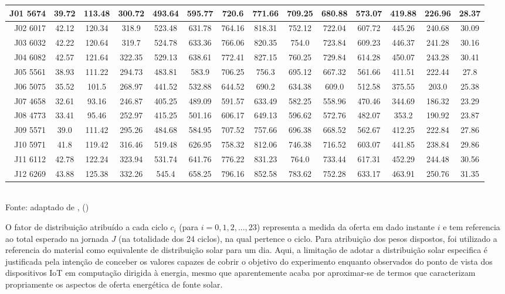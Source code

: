 \begin{table}[h]
\begin{tabular}{ r | *{13}{c} }
	\hline
	J01 5674 & 39.72 & 113.48 & 300.72 & 493.64 & 595.77 & 720.6 & 771.66 & 709.25 & 680.88 & 573.07 & 419.88 & 226.96 & 28.37\\
	\hline
	J02 6017 & 42.12 & 120.34 & 318.9 & 523.48 & 631.78 & 764.16 & 818.31 & 752.12 & 722.04 & 607.72 & 445.26 & 240.68 & 30.09 \\
	\hline
	J03 6032 &  42.22 & 120.64 & 319.7 & 524.78 & 633.36 & 766.06 & 820.35 & 754.0 & 723.84 & 609.23 & 446.37 & 241.28 & 30.16 \\
	\hline
	J04 6082 & 42.57 & 121.64 & 322.35 & 529.13 & 638.61 & 772.41 & 827.15 & 760.25 & 729.84 & 614.28 & 450.07 & 243.28 & 30.41 \\
	\hline
	J05 5561 & 38.93 & 111.22 & 294.73 & 483.81 & 583.9 & 706.25 & 756.3 & 695.12 & 667.32 & 561.66 & 411.51 & 222.44 & 27.8\\
	\hline
	J06 5075 & 35.52 & 101.5 & 268.97 & 441.52 & 532.88 & 644.52 & 690.2 & 634.38 & 609.0 & 512.58 & 375.55 & 203.0 & 25.38 \\
	\hline
	J07 4658 & 32.61 & 93.16 & 246.87 & 405.25 & 489.09 & 591.57 & 633.49 & 582.25 & 558.96 & 470.46 & 344.69 & 186.32 & 23.29 \\
	\hline
	J08 4773 & 33.41 & 95.46 & 252.97 & 415.25 & 501.16 & 606.17 & 649.13 & 596.62 & 572.76 & 482.07 & 353.2 & 190.92 & 23.87\\
	\hline
	J09 5571 & 39.0 & 111.42 & 295.26 & 484.68 & 584.95 & 707.52 & 757.66 & 696.38 & 668.52 & 562.67 & 412.25 & 222.84 & 27.86\\
	\hline
	J10 5971 & 41.8 & 119.42 & 316.46 & 519.48 & 626.95 & 758.32 & 812.06 & 746.38 & 716.52 & 603.07 & 441.85 & 238.84 & 29.86 \\
	\hline
	J11 6112 & 42.78 & 122.24 & 323.94 & 531.74 & 641.76 & 776.22 & 831.23 & 764.0 & 733.44 & 617.31 & 452.29 & 244.48 & 30.56 \\
	\hline
	J12 6269 & 43.88 & 125.38 & 332.26 & 545.4 & 658.25 & 796.16 & 852.58 & 783.62 & 752.28 & 633.17 & 463.91 & 250.76 & 31.35 \\
\bottomrule
\end{tabular}
\label{table:cap6distribuicaonatal}
\\
\footnotesize Fonte: adaptado de \citeauthor{martins2017atlas}, (\citeyear{martins2017atlas})

\end{table}
\endgroup

O fator de distribuição atribuído a cada ciclo $c_i$ (para $i=0,1,2,...,23$) representa a medida da oferta em dado instante $i$ e tem referencia ao total esperado na jornada $J$ (na totalidade dos 24 ciclos), na qual pertence o ciclo. Para atribuição dos pesos dispostos, foi utilizado a referencia do material \cite{tutiempo2023} como equivalente de distribuição solar para um dia. Aqui, a limitação de adotar a distribuição solar especifica é justificada pela intenção de conceber os valores capazes de cobrir o objetivo do experimento enquanto observados do ponto de vista dos dispositivos \acs{IoT} em computação dirigida à energia, mesmo que aparentemente acaba por aproximar-se de termos que caracterizam propriamente os aspectos de oferta energética de fonte solar. 


